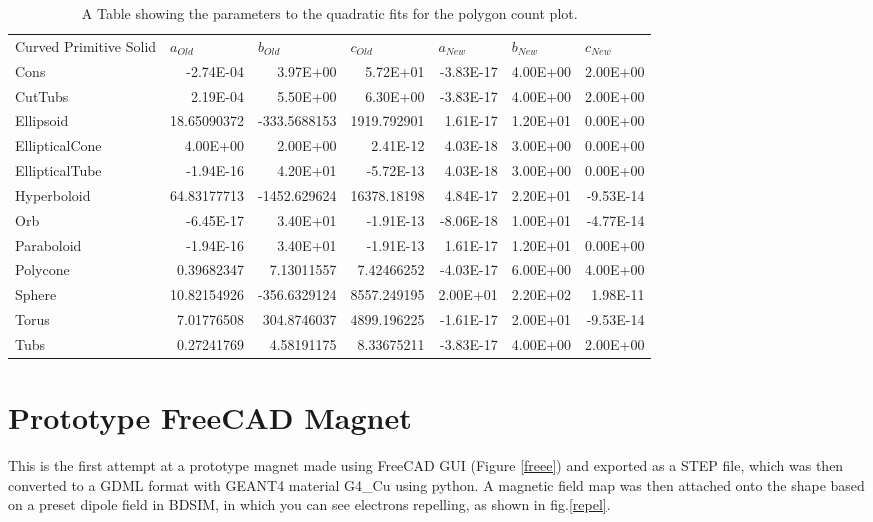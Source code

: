 \documentclass[12pt,a4paper]{article}
\begin{document}
\small
%
\begin{table}[htbp]
  \small
  \centering
  \caption{A Table showing the parameters to the quadratic fits for the polygon count plot.}
    \begin{tabular}{lrrrrrr}
    Curved Primitive Solid & \multicolumn{1}{l}{$a_{Old}$} & \multicolumn{1}{l}{$b_{Old}$} & \multicolumn{1}{l}{$c_{Old}$} & \multicolumn{1}{l}{$a_{New}$} & \multicolumn{1}{l}{$b_{New}$} & \multicolumn{1}{l}{$c_{New}$} \\
    Cons  & -2.74E-04 & 3.97E+00 & 5.72E+01 & -3.83E-17 & 4.00E+00 & 2.00E+00 \\
    CutTubs & 2.19E-04 & 5.50E+00 & 6.30E+00 & -3.83E-17 & 4.00E+00 & 2.00E+00 \\
    Ellipsoid & 18.65090372 & -333.5688153 & 1919.792901 & 1.61E-17 & 1.20E+01 & 0.00E+00 \\
    EllipticalCone & 4.00E+00 & 2.00E+00 & 2.41E-12 & 4.03E-18 & 3.00E+00 & 0.00E+00 \\
    EllipticalTube & -1.94E-16 & 4.20E+01 & -5.72E-13 & 4.03E-18 & 3.00E+00 & 0.00E+00 \\
    Hyperboloid & 64.83177713 & -1452.629624 & 16378.18198 & 4.84E-17 & 2.20E+01 & -9.53E-14 \\
    Orb   & -6.45E-17 & 3.40E+01 & -1.91E-13 & -8.06E-18 & 1.00E+01 & -4.77E-14 \\
    Paraboloid & -1.94E-16 & 3.40E+01 & -1.91E-13 & 1.61E-17 & 1.20E+01 & 0.00E+00 \\
    Polycone & 0.39682347 & 7.13011557 & 7.42466252 & -4.03E-17 & 6.00E+00 & 4.00E+00 \\
    Sphere & 10.82154926 & -356.6329124 & 8557.249195 & 2.00E+01 & 2.20E+02 & 1.98E-11 \\
    Torus & 7.01776508 & 304.8746037 & 4899.196225 & -1.61E-17 & 2.00E+01 & -9.53E-14 \\
    Tubs  & 0.27241769 & 4.58191175 & 8.33675211 & -3.83E-17 & 4.00E+00 & 2.00E+00 \\
    \end{tabular}%
  \label{tab1}%
\end{table}
\section{Prototype FreeCAD Magnet}
\label{mag}
This is the first attempt at a prototype magnet made using FreeCAD GUI (Figure \ref{freee}) and exported as a STEP file, which was then converted to a GDML format with GEANT4 material G4\_Cu using python. A magnetic field map was then attached onto the shape based on a preset dipole field in BDSIM, in which you can see electrons repelling, as shown in fig.\ref{repel}.
\end{document}
